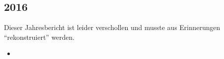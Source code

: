\subsection{2016}
\begin{history}

    Dieser Jahresbericht ist leider verschollen und musste aus Erinnerungen \enquote{rekonstruiert} werden.

    \begin{itemize}

        \item \\


    \end{itemize}

\end{history}
